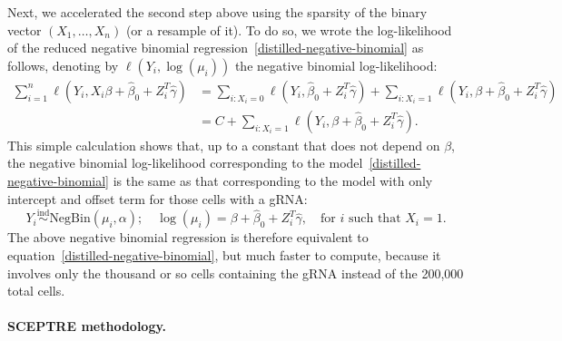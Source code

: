 \documentclass{nature}
\begin{document}
Next, we accelerated the second step above using the sparsity of the binary vector $(X_1, \dots, X_n)$ (or a resample of it). To do so, we wrote the log-likelihood of the reduced negative binomial regression~\eqref{distilled-negative-binomial} as follows, denoting by $\ell(Y_i, \log(\mu_i))$ the negative binomial log-likelihood:
\begin{equation*}
\begin{split}
\sum_{i = 1}^n \ell(Y_i, X_i \beta + \widehat \beta_0 + Z_i^T \widehat \gamma) &= \sum_{i: X_i = 0} \ell(Y_i, \widehat \beta_0 + Z_i^T \widehat \gamma) + \sum_{i: X_i = 1} \ell(Y_i, \beta + \widehat \beta_0 + Z_i^T \widehat \gamma) \\
&= C + \sum_{i: X_i = 1} \ell(Y_i, \beta + \widehat \beta_0 + Z_i^T \widehat \gamma).
\end{split}
\end{equation*}
This simple calculation shows that, up to a constant that does not depend on $\beta$, the negative binomial log-likelihood corresponding to the model~\eqref{distilled-negative-binomial} is the same as that corresponding to the model with only intercept and offset term for those cells with a gRNA:
\begin{equation}
Y_i \overset{\text{ind}}\sim \textrm{NegBin}(\mu_i, \alpha); \quad \log(\mu_i) = \beta + \widehat \beta_0 + Z_i^T \widehat \gamma, \quad \text{for } i \text{ such that } X_i = 1.
\label{distilled-negative-binomial-accelerated}
\end{equation}
The above negative binomial regression is therefore equivalent to equation~\eqref{distilled-negative-binomial}, but much faster to compute, because it involves only the thousand or so cells containing the gRNA instead of the 200,000 total cells.

\paragraph{SCEPTRE methodology.}
\end{document}
